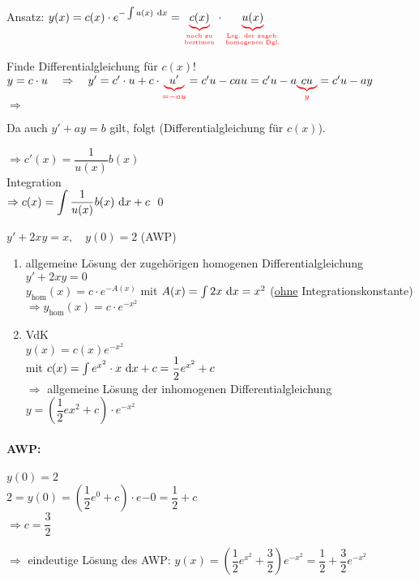 Ansatz: $y(x)=c(x)\cdot e^{-\int a(x)\intd{x}}=\redunderbrace{c(x)}{\text{noch zu}\atop\text{bestimen}}\cdot\redunderbrace{u(x)}{\text{Lsg. der zugeh.}\atop\text{homogenen Dgl.}}$

\Idee Finde Differentialgleichung für $c(x)$!\\
$y=c\cdot u\quad\Rightarrow\quad y'=c'\cdot u+c\cdot\redunderbrace{u'}{=-au}=c'u-cau=c'u-a\redunderbrace{cu}{y}=c'u-ay$\\
$\Rightarrow$ 

Da auch $y'+ay=b$ gilt, folgt  (Differentialgleichung für $c(x)$).

$\Rightarrow c'(x)=\dfrac{1}{u(x)}b(x)$\\
Integration\\
$\Rightarrow c(x)=\displaystyle\int\dfrac{1}{u(x)}b(x)\ \mathrm{d}x+c$
\qed

\Bsp $y'+2xy=x,\quad y(0)=2$ (AWP)
\begin{enumerate}
	\item allgemeine Lösung der zugehörigen homogenen Differentialgleichung\\
	\hhspace{2cm}$y'+2xy=0$\\
	$y_{\text{hom}}(x)=c\cdot e^{-A(x)}$ mit $A(x)=\int2x\ \mathrm{d}x=x^2$ (\ul{ohne} Integrationskonstante)\\
	$\Rightarrow y_{\text{hom}}(x)=c\cdot e^{-x^2}$
	
	\item VdK\\
	$y(x)=c(x)e^{-x^2}$\\
	mit $c(x)=\int e^{x^2}\cdot x\ \mathrm{d}x+c=\dfrac{1}{2}e^{x^2}+c$\\
	$\Rightarrow$ allgemeine Lösung der inhomogenen Differentialgleichung\\
	$y=(\dfrac{1}{2}e{x^2}+c)\cdot e^{-x^2}$
\end{enumerate}

\paragraph{AWP:} $y(0)=2$\\
$2=y(0)=(\dfrac{1}{2}e^0+c)\cdot e{-0}=\dfrac{1}{2}+c$\\
$\Rightarrow c=\dfrac{3}{2}$

$\Rightarrow$ eindeutige Lösung des AWP: $y(x)=(\dfrac{1}{2}e^{x^2}+\dfrac{3}{2})e^{-x^2}=\dfrac{1}{2}+\dfrac{3}{2}e^{-x^2}$

\placeholder

